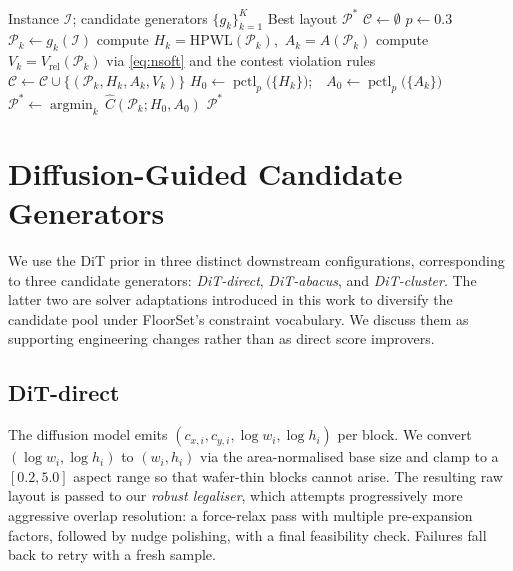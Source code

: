 \documentclass[nolineno]{ieeeaccess}
\begin{document}
\begin{algorithm}[t]
\caption{Gap-aware candidate reranker}
\label{alg:rerank}
\begin{algorithmic}[1]
\Require Instance $\mathcal{I}$; candidate generators $\{g_k\}_{k=1}^K$
\Ensure Best layout $\mathcal{P}^{*}$
\State $\mathcal{C} \gets \emptyset$ 
\State $p \gets 0.3$ 
    \State $\mathcal{P}_k \gets g_k(\mathcal{I})$
        \State compute $H_k = \text{HPWL}(\mathcal{P}_k)$,\ $A_k = A(\mathcal{P}_k)$
        \State compute $V_k = V_{\text{rel}}(\mathcal{P}_k)$ via
               \eqref{eq:nsoft} and the contest violation rules
        \State $\mathcal{C} \gets \mathcal{C} \cup \{(\mathcal{P}_k, H_k, A_k, V_k)\}$
    \EndIf
\EndFor
\State $H_0 \gets \operatorname{pctl}_{p}\bigl(\{H_k\}\bigr)$;\ \ $A_0 \gets \operatorname{pctl}_{p}\bigl(\{A_k\}\bigr)$
\State $\mathcal{P}^{*} \gets \operatorname*{argmin}_{k}\,\widehat{C}(\mathcal{P}_k; H_0, A_0)$
\State \Return $\mathcal{P}^{*}$
\end{algorithmic}
\end{algorithm}

\section{Diffusion-Guided Candidate Generators}
\label{sec:diffusion-generators}

We use the DiT prior in three distinct downstream configurations,
corresponding to three candidate generators: \emph{DiT-direct},
\emph{DiT-abacus}, and \emph{DiT-cluster}. The latter two are
solver adaptations introduced in this work to diversify the candidate
pool under FloorSet's constraint vocabulary. We discuss them as
supporting engineering changes rather than as direct score improvers.

\subsection{DiT-direct}
The diffusion model emits $(c_{x,i}, c_{y,i}, \log\!w_i, \log\!h_i)$ per
block. We convert $(\log\!w_i, \log\!h_i)$ to $(w_i, h_i)$ via the
area-normalised base size and clamp to a $[0.2, 5.0]$ aspect range so
that wafer-thin blocks cannot arise. The resulting raw layout is
passed to our \emph{robust legaliser}, which attempts progressively
more aggressive overlap resolution: a force-relax pass with multiple
pre-expansion factors, followed by nudge polishing, with a final
feasibility check. Failures fall back to retry with a fresh sample.
\end{document}

